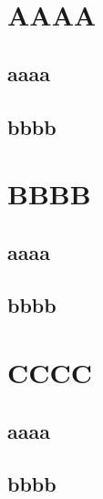 \documentclass[openany]{book}
\begin{document}
\chapter{AAAA}
\section{aaaa}
\lipsum[1-3]
\section{bbbb}
\lipsum[1-3]

\chapter*{BBBB}
\section*{aaaa}
\lipsum[1-3]
\section*{bbbb}
\lipsum[1-3]

\chapter{CCCC}
\section{aaaa}
\lipsum[1-3]
\section{bbbb}
\lipsum[1-3]
\end{document}
